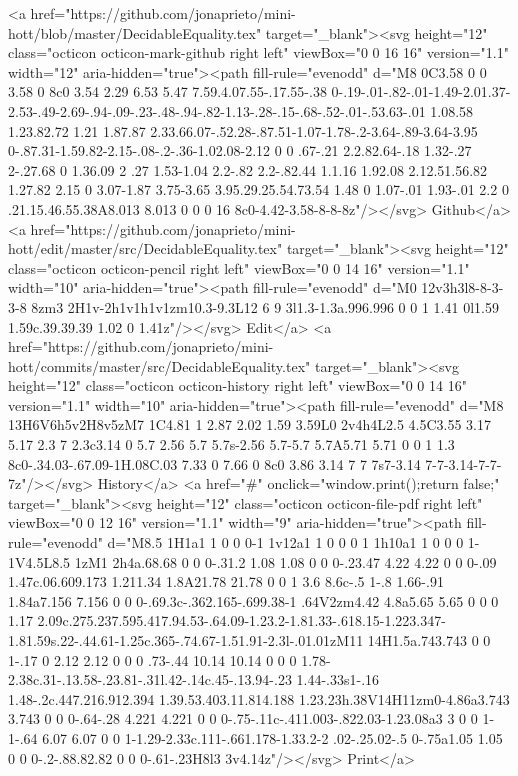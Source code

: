       <a href="https://github.com/jonaprieto/mini-hott/blob/master/DecidableEquality.tex" target="_blank"><svg height="12" class="octicon octicon-mark-github right left" viewBox="0 0 16 16" version="1.1" width="12" aria-hidden="true"><path fill-rule="evenodd" d="M8 0C3.58 0 0 3.58 0 8c0 3.54 2.29 6.53 5.47 7.59.4.07.55-.17.55-.38 0-.19-.01-.82-.01-1.49-2.01.37-2.53-.49-2.69-.94-.09-.23-.48-.94-.82-1.13-.28-.15-.68-.52-.01-.53.63-.01 1.08.58 1.23.82.72 1.21 1.87.87 2.33.66.07-.52.28-.87.51-1.07-1.78-.2-3.64-.89-3.64-3.95 0-.87.31-1.59.82-2.15-.08-.2-.36-1.02.08-2.12 0 0 .67-.21 2.2.82.64-.18 1.32-.27 2-.27.68 0 1.36.09 2 .27 1.53-1.04 2.2-.82 2.2-.82.44 1.1.16 1.92.08 2.12.51.56.82 1.27.82 2.15 0 3.07-1.87 3.75-3.65 3.95.29.25.54.73.54 1.48 0 1.07-.01 1.93-.01 2.2 0 .21.15.46.55.38A8.013 8.013 0 0 0 16 8c0-4.42-3.58-8-8-8z"/></svg> Github</a>
      <a href="https://github.com/jonaprieto/mini-hott/edit/master/src/DecidableEquality.tex" target="_blank"><svg height="12" class="octicon octicon-pencil right left" viewBox="0 0 14 16" version="1.1" width="10" aria-hidden="true"><path fill-rule="evenodd" d="M0 12v3h3l8-8-3-3-8 8zm3 2H1v-2h1v1h1v1zm10.3-9.3L12 6 9 3l1.3-1.3a.996.996 0 0 1 1.41 0l1.59 1.59c.39.39.39 1.02 0 1.41z"/></svg> Edit</a>
      <a href="https://github.com/jonaprieto/mini-hott/commits/master/src/DecidableEquality.tex" target="_blank"><svg height="12" class="octicon octicon-history right left" viewBox="0 0 14 16" version="1.1" width="10" aria-hidden="true"><path fill-rule="evenodd" d="M8 13H6V6h5v2H8v5zM7 1C4.81 1 2.87 2.02 1.59 3.59L0 2v4h4L2.5 4.5C3.55 3.17 5.17 2.3 7 2.3c3.14 0 5.7 2.56 5.7 5.7s-2.56 5.7-5.7 5.7A5.71 5.71 0 0 1 1.3 8c0-.34.03-.67.09-1H.08C.03 7.33 0 7.66 0 8c0 3.86 3.14 7 7 7s7-3.14 7-7-3.14-7-7-7z"/></svg> History</a>
      <a  href="#" onclick="window.print();return false;" target="_blank"><svg height="12" class="octicon octicon-file-pdf right left" viewBox="0 0 12 16" version="1.1" width="9" aria-hidden="true"><path fill-rule="evenodd" d="M8.5 1H1a1 1 0 0 0-1 1v12a1 1 0 0 0 1 1h10a1 1 0 0 0 1-1V4.5L8.5 1zM1 2h4a.68.68 0 0 0-.31.2 1.08 1.08 0 0 0-.23.47 4.22 4.22 0 0 0-.09 1.47c.06.609.173 1.211.34 1.8A21.78 21.78 0 0 1 3.6 8.6c-.5 1-.8 1.66-.91 1.84a7.156 7.156 0 0 0-.69.3c-.362.165-.699.38-1 .64V2zm4.42 4.8a5.65 5.65 0 0 0 1.17 2.09c.275.237.595.417.94.53-.64.09-1.23.2-1.81.33-.618.15-1.223.347-1.81.59s.22-.44.61-1.25c.365-.74.67-1.51.91-2.3l-.01.01zM11 14H1.5a.743.743 0 0 1-.17 0 2.12 2.12 0 0 0 .73-.44 10.14 10.14 0 0 0 1.78-2.38c.31-.13.58-.23.81-.31l.42-.14c.45-.13.94-.23 1.44-.33s1-.16 1.48-.2c.447.216.912.394 1.39.53.403.11.814.188 1.23.23h.38V14H11zm0-4.86a3.743 3.743 0 0 0-.64-.28 4.221 4.221 0 0 0-.75-.11c-.411.003-.822.03-1.23.08a3 3 0 0 1-1-.64 6.07 6.07 0 0 1-1.29-2.33c.111-.661.178-1.33.2-2 .02-.25.02-.5 0-.75a1.05 1.05 0 0 0-.2-.88.82.82 0 0 0-.61-.23H8l3 3v4.14z"/></svg> Print</a>
